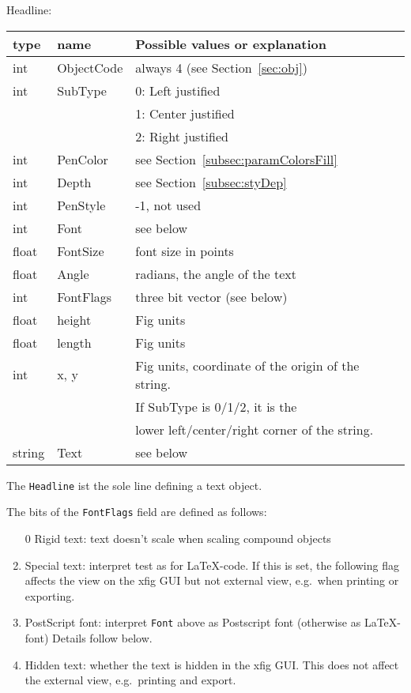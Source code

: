 \documentclass[10pt, a4paper]{article}%
\begin{document}
\noindent
Headline: \\
%
\begin{tabular}{lll}
\toprule
type   & name       & Possible values or explanation \\
\midrule
\midrule
int    & ObjectCode & always 4 (see Section~\ref{sec:obj}) \\
int    & SubType    & 0: Left justified \\ %
&&                    1: Center justified \\
&&                    2: Right justified \\
int    & PenColor   & see Section~\ref{subsec:paramColorsFill} \\
int    & Depth      & see Section~\ref{subsec:styDep} \\
int    & PenStyle   & -1, not used \\
int    & Font       & see below \\
float  & FontSize   & font size in points \\
float  & Angle      & radians, the angle of the text \\
int    & FontFlags  & three bit vector (see below) \\
float  & height     & Fig units \\
float  & length     & Fig units \\
int    & x, y       & Fig units, coordinate of the origin of the string.  \\
&&                    If SubType is 0/1/2, it is the \\
&&                    lower left/center/right corner of the string.\\
string & Text       & see below \\
\bottomrule
\end{tabular}

The \texttt{Headline} ist the sole line defining a text object. 

\noindent
The bits of the \texttt{FontFlags} field are defined as follows:
%
\begin{enumerate}
\item[0]
Rigid text: text doesn't scale when scaling compound objects
\item
Special text: interpret test as for \LaTeX-code. 
If this is set, the following flag affects the view on the xfig GUI 
but not external view, e.g.~when printing or exporting. 
\item
PostScript font: interpret \texttt{Font} above 
as Postscript font (otherwise as \LaTeX{}-font) 
Details follow below. 
\item
Hidden text: whether the text is hidden in the xfig GUI\@. 
This does not affect the external view, e.g.~printing and export. 
\end{enumerate}
\end{document}
